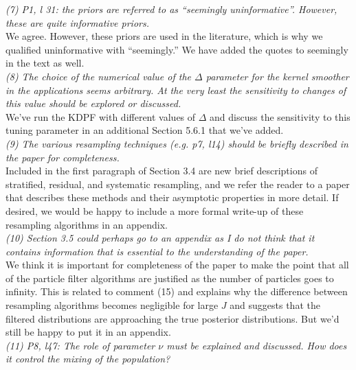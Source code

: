 \documentclass{article}
\begin{document}
\noindent \emph{(7) P1, l 31: the priors are referred to as ``seemingly uninformative''. However, these are quite informative priors.} \\

We agree. However, these priors are used in the literature, which is why we qualified uninformative with ``seemingly.'' We have added the quotes to seemingly in the text as well. \\

\noindent \emph{(8) The choice of the numerical value of the $\Delta$ parameter for the kernel smoother in the applications seems arbitrary. At the very least the sensitivity to changes of this value should be explored or discussed.} \\

We've run the KDPF with different values of $\Delta$ and discuss the sensitivity to this tuning parameter in an additional Section 5.6.1 that we've added. \\

\noindent \emph{(9) The various resampling techniques (e.g. p7, l14) should be briefly described in the paper for completeness.} \\

Included in the first paragraph of Section 3.4 are new brief descriptions of stratified, residual, and systematic resampling, and we refer the reader to a paper that describes these methods and their asymptotic properties in more detail. If desired, we would be happy to include a more formal write-up of these resampling algorithms in an appendix. \\

\noindent \emph{(10) Section 3.5 could perhaps go to an appendix as I do not think that it contains information that is essential to the understanding of the paper.} \\

We think it is important for completeness of the paper to make the point that all of the particle filter algorithms are justified as the number of particles goes to infinity. This is related to comment (15) and explains why the difference between resampling algorithms becomes negligible for large $J$ and suggests that the filtered distributions are approaching the true posterior distributions. But we'd still be happy to put it in an appendix. \\

\noindent \emph{(11) P8, l47: The role of parameter $\nu$ must be explained and discussed. How does it control the mixing of the population?} \\
\end{document}
